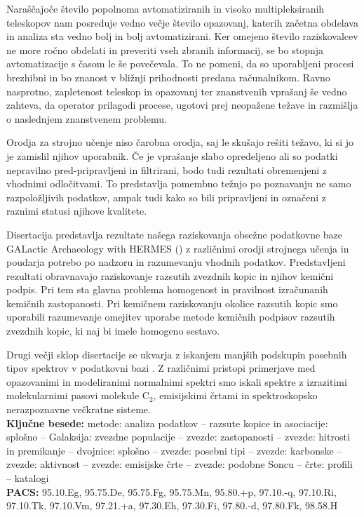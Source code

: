 Naraščajoče število popolnoma avtomatiziranih in visoko multipleksiranih teleskopov nam posreduje vedno večje število opazovanj, katerih začetna obdelava in analiza sta vedno bolj in bolj avtomatizirani. Ker omejeno število raziskovalcev ne more ročno obdelati in preveriti vseh zbranih informacij, se bo stopnja avtomatizacije s časom le še povečevala. To ne pomeni, da so uporabljeni procesi brezhibni in bo znanost v bližnji prihodnosti predana računalnikom. Ravno nasprotno, zapletenost teleskop in opazovanj ter  znanstvenih vprašanj še vedno zahteva, da operator prilagodi procese, ugotovi prej neopažene težave in razmišlja o naslednjem znanstvenem problemu.

Orodja za strojno učenje niso čarobna orodja, saj le skušajo rešiti težavo, ki si jo je zamislil njihov uporabnik. Če je vprašanje slabo opredeljeno ali so podatki nepravilno pred-pripravljeni in filtrirani, bodo tudi rezultati obremenjeni z vhodnimi odločitvami. To predstavlja pomembno težnjo po poznavanju ne samo razpoložljivih podatkov, ampak tudi kako so bili pripravljeni in označeni z raznimi statusi njihove kvalitete.

Disertacija predstavlja rezultate našega raziskovanja obsežne podatkovne baze GALactic Archaeology with HERMES (\Gh) z različnimi orodji strojnega učenja in poudarja potrebo po nadzoru in razumevanju vhodnih podatkov. Predstavljeni rezultati obravnavajo raziskovanje razsutih zvezdnih kopic in njihov kemični podpis. Pri tem sta glavna problema homogenost in pravilnost izračunanih kemičnih zastopanosti. Pri kemičnem raziskovanju okolice razsutih kopic smo uporabili razumevanje omejitev uporabe metode kemičnih podpisov razsutih zvezdnih kopic, ki naj bi imele homogeno sestavo.

Drugi večji sklop disertacije se ukvarja z iskanjem manjših podskupin posebnih tipov spektrov v podatkovni bazi \Gh. Z različnimi pristopi primerjave med opazovanimi in modeliranimi normalnimi spektri smo iskali spektre z izrazitimi molekularnimi pasovi molekule C$_2 $, emisijskimi črtami in spektroskopsko nerazpoznavne večkratne sisteme.\\[10mm]
{\bf Ključne besede:} metode: analiza podatkov -- razsute kopice in asociacije: splošno -- Galaksija: zvezdne populacije -- zvezde: zastopanosti -- zvezde: hitrosti in premikanje -- dvojnice: splošno -- zvezde: posebni tipi -- zvezde: karbonske -- zvezde: aktivnost -- zvezde: emisijske črte -- zvezde: podobne Soncu -- črte: profili -- katalogi\\[3mm]
{\bf PACS:} 95.10.Eg, 95.75.De, 95.75.Fg, 95.75.Mn, 95.80.+p, 97.10.-q, 97.10.Ri, 97.10.Tk, 97.10.Vm, 97.21.+a, 97.30.Eh, 97.30.Fi, 97.80.-d, 97.80.Fk, 98.58.H